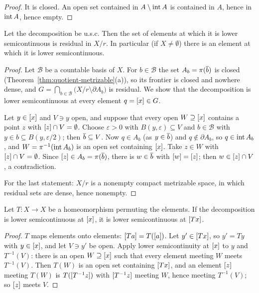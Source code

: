 \begin{proof}
It is closed. An open set contained in $A\setminus\operatorname{int} A$ is contained in $A$, hence in $\operatorname{int}
A$, hence empty.
\end{proof}


\begin{theorem}\label{thm:residual}
Let the decomposition be u.s.c. Then the set of elements at which it is lower semicontinuous is
residual in $X/r$. In particular (if $X\ne\emptyset$) there is an element at which it is lower
semicontinuous.
\end{theorem}

\begin{proof}
Let $\mathcal B$ be a countable basis of $X$. For $b\in\mathcal B$ the set $A_b=\pi(\overline{b})$ is closed
(Theorem~\ref{thm:quotient-metrizable}(a)), so its frontier is closed and nowhere dense, and
$G=\bigcap_{b\in\mathcal B}\bigl(X/r\setminus\partial A_b\bigr)$ is residual. We show that the
decomposition is lower semicontinuous at every element $q=[x]\in G$.

Let $y\in[x]$ and $V\ni y$ open, and suppose that every open $W\supseteq[x]$ contains a point $z$ with
$[z]\cap V=\emptyset$. Choose $\varepsilon>0$ with $B(y,\varepsilon)\subseteq V$ and $b\in\mathcal B$ with $y\in
b\subseteq B(y,\varepsilon/2)$; then $\overline{b}\subseteq V$. Now $q\in A_b$ (as $y\in\overline{b}$) and $q\notin\partial A_b$,
so $q\in\operatorname{int} A_b$, and $W=\pi^{-1}(\operatorname{int} A_b)$ is an open set containing $[x]$. Take $z\in W$
with $[z]\cap V=\emptyset$. Since $[z]\in A_b=\pi(\overline{b})$, there is $w\in\overline{b}$ with $[w]=[z]$;
then $w\in[z]\cap V$, a contradiction.

For the last statement: $X/r$ is a nonempty compact metrizable space, in which residual sets are
dense, hence nonempty.
\end{proof}


\begin{proposition}\label{prop:lsc-homeo}
Let $T\colon X\to X$ be a homeomorphism permuting the elements. If the decomposition is lower
semicontinuous at $[x]$, it is lower semicontinuous at $[Tx]$.
\end{proposition}

\begin{proof}
$T$ maps elements onto elements: $[Ta]=T([a])$. Let $y'\in[Tx]$, so $y'=Ty$ with $y\in[x]$,
and let $V\ni y'$ be open. Apply lower semicontinuity at $[x]$ to $y$ and $T^{-1}(V)$: there is an
open $W\supseteq[x]$ such that every element meeting $W$ meets $T^{-1}(V)$. Then $T(W)$ is an open set
containing $[Tx]$, and an element $[z]$ meeting $T(W)$ is $T([T^{-1}z])$ with
$[T^{-1}z]$ meeting $W$, hence meeting $T^{-1}(V)$; so $[z]$ meets $V$.
\end{proof}

